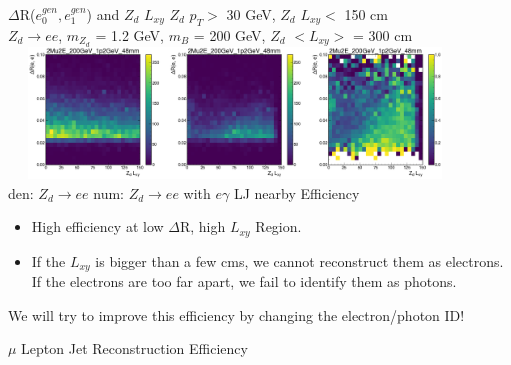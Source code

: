 \documentclass{beamer}
\begin{document}
\begin{frame}[t]{$\Delta$R($e^{gen}_0, e^{gen}_1$) and $Z_d$ $L_{xy}$ }
 \centering
 $Z_d$ $p_T>$ 30 GeV, $Z_d$ $L_{xy}<$ 150 cm\\

 \scriptsize
\textcolor{UniBlue}{$Z_d \rightarrow ee$}, \textcolor{uvaorange}{$m_{Z_d}$ = 1.2 GeV, $m_B$ = 200 GeV, $Z_d$ $<L_{xy}>$ = 300 cm}\\
\centering
\includegraphics[width =12cm, height =3.5cm]{zd_ee_lxy_dR_1p2.png}\\
{\tiny \textcolor{uvaorange}{\hspace{0cm}den: $Z_d\rightarrow ee$ \hspace{2.5cm } num: $Z_d\rightarrow ee$ with  $e\gamma$ LJ nearby\hspace{2cm} Efficiency\\}}
\normalsize
\begin{itemize}
    \item High efficiency at low $\Delta$R, high $L_{xy}$ Region.
     \vspace{1pt}
    \item If the $L_{xy}$ is bigger than a few cms, we cannot reconstruct them as electrons. If the electrons are too far apart, we fail to identify them as photons.
\end{itemize}
We will try to improve this efficiency by changing the electron/photon ID!
\end{frame}
\begin{frame}{}
\centering
\Huge
$\mu$ Lepton Jet Reconstruction Efficiency
\end{frame}
\end{document}
